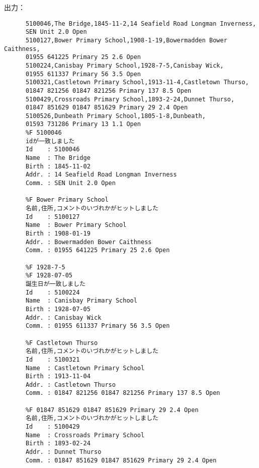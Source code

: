       出力：
      \begin{verbatim}
      5100046,The Bridge,1845-11-2,14 Seafield Road Longman Inverness,
      SEN Unit 2.0 Open
      5100127,Bower Primary School,1908-1-19,Bowermadden Bower Caithness,
      01955 641225 Primary 25 2.6 Open
      5100224,Canisbay Primary School,1928-7-5,Canisbay Wick,
      01955 611337 Primary 56 3.5 Open
      5100321,Castletown Primary School,1913-11-4,Castletown Thurso,
      01847 821256 01847 821256 Primary 137 8.5 Open
      5100429,Crossroads Primary School,1893-2-24,Dunnet Thurso,
      01847 851629 01847 851629 Primary 29 2.4 Open
      5100526,Dunbeath Primary School,1805-1-8,Dunbeath,
      01593 731286 Primary 13 1.1 Open
      %F 5100046
      idが一致しました
      Id    : 5100046
      Name  : The Bridge
      Birth : 1845-11-02
      Addr. : 14 Seafield Road Longman Inverness
      Comm. : SEN Unit 2.0 Open
      
      %F Bower Primary School
      名前,住所,コメントのいづれかがヒットしました
      Id    : 5100127
      Name  : Bower Primary School
      Birth : 1908-01-19
      Addr. : Bowermadden Bower Caithness
      Comm. : 01955 641225 Primary 25 2.6 Open
      
      %F 1928-7-5
      %F 1928-07-05
      誕生日が一致しました
      Id    : 5100224
      Name  : Canisbay Primary School
      Birth : 1928-07-05
      Addr. : Canisbay Wick
      Comm. : 01955 611337 Primary 56 3.5 Open
      
      %F Castletown Thurso
      名前,住所,コメントのいづれかがヒットしました
      Id    : 5100321
      Name  : Castletown Primary School
      Birth : 1913-11-04
      Addr. : Castletown Thurso
      Comm. : 01847 821256 01847 821256 Primary 137 8.5 Open
      
      %F 01847 851629 01847 851629 Primary 29 2.4 Open
      名前,住所,コメントのいづれかがヒットしました
      Id    : 5100429
      Name  : Crossroads Primary School
      Birth : 1893-02-24
      Addr. : Dunnet Thurso
      Comm. : 01847 851629 01847 851629 Primary 29 2.4 Open
      \end{verbatim}
      

